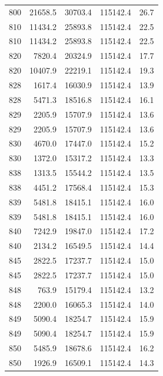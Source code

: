 \begin{longtable}{rrrrr}
    800 & \num{21658.5} & \num{30703.4} & \num{115142.4} & 26.7 \\
    810 & \num{11434.2} & \num{25893.8} & \num{115142.4} & 22.5 \\
    810 & \num{11434.2} & \num{25893.8} & \num{115142.4} & 22.5 \\
    820 & \num{7820.4} & \num{20324.9} & \num{115142.4} & 17.7 \\
    820 & \num{10407.9} & \num{22219.1} & \num{115142.4} & 19.3 \\
    828 & \num{1617.4} & \num{16030.9} & \num{115142.4} & 13.9 \\
    828 & \num{5471.3} & \num{18516.8} & \num{115142.4} & 16.1 \\
    829 & \num{2205.9} & \num{15707.9} & \num{115142.4} & 13.6 \\
    829 & \num{2205.9} & \num{15707.9} & \num{115142.4} & 13.6 \\
    830 & \num{4670.0} & \num{17447.0} & \num{115142.4} & 15.2 \\
    830 & \num{1372.0} & \num{15317.2} & \num{115142.4} & 13.3 \\
    838 & \num{1313.5} & \num{15544.2} & \num{115142.4} & 13.5 \\
    838 & \num{4451.2} & \num{17568.4} & \num{115142.4} & 15.3 \\
    839 & \num{5481.8} & \num{18415.1} & \num{115142.4} & 16.0 \\
    839 & \num{5481.8} & \num{18415.1} & \num{115142.4} & 16.0 \\
    840 & \num{7242.9} & \num{19847.0} & \num{115142.4} & 17.2 \\
    840 & \num{2134.2} & \num{16549.5} & \num{115142.4} & 14.4 \\
    845 & \num{2822.5} & \num{17237.7} & \num{115142.4} & 15.0 \\
    845 & \num{2822.5} & \num{17237.7} & \num{115142.4} & 15.0 \\
    848 & \num{763.9} & \num{15179.4} & \num{115142.4} & 13.2 \\
    848 & \num{2200.0} & \num{16065.3} & \num{115142.4} & 14.0 \\
    849 & \num{5090.4} & \num{18254.7} & \num{115142.4} & 15.9 \\
    849 & \num{5090.4} & \num{18254.7} & \num{115142.4} & 15.9 \\
    850 & \num{5485.9} & \num{18678.6} & \num{115142.4} & 16.2 \\
    850 & \num{1926.9} & \num{16509.1} & \num{115142.4} & 14.3 \\

\end{longtable}
